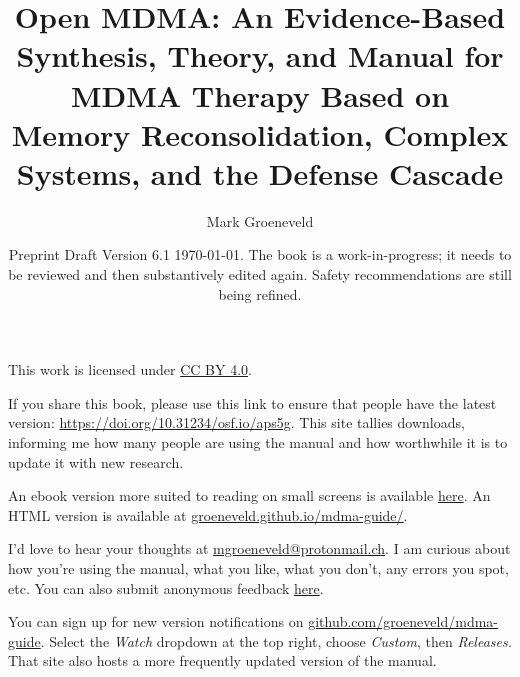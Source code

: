 \documentclass[11pt,oneside]{book}
\begin{document}

\frontmatter

\title{Open MDMA: An Evidence-Based Synthesis, Theory, and Manual for MDMA Therapy Based on Memory Reconsolidation, Complex Systems, and the Defense Cascade}
\author{
    Mark Groeneveld
}
\date{Preprint Draft Version 6.1 \today. The book is a work-in-progress; it needs to be reviewed and then substantively edited again. Safety recommendations are still being refined.}

\maketitle

\begin{center}
    This work is licensed under \href{https://creativecommons.org/licenses/by/4.0/}{CC BY 4.0}.

    \vspace{\baselineskip}

    If you share this book, please use this link to ensure that people have the latest version: \href{https://doi.org/10.31234/osf.io/aps5g}{https://doi.org/10.31234/osf.io/aps5g}. This site tallies downloads, informing me how many people are using the manual and how worthwhile it is to update it with new research.

    \vspace{\baselineskip}

    An ebook version more suited to reading on small screens is available \href{https://raw.githubusercontent.com/groeneveld/mdma-guide/refs/heads/main/Open%20MDMA.epub}{here}. An HTML version is available at \href{https://groeneveld.github.io/mdma-guide/}{groeneveld.github.io/mdma-guide/}.

    \vspace{\baselineskip}

    I'd love to hear your thoughts at \href{mailto:mgroeneveld@protonmail.ch}{mgroeneveld@protonmail.ch}. I am curious about how you're using the manual, what you like, what you don't, any errors you spot, etc. You can also submit anonymous feedback \href{https://docs.google.com/forms/d/e/1FAIpQLScZe2h4L9PcLQGGpuerk44FXiWThRC2w6YNwSm67OXIJun-rA/viewform?usp=dialog}{here}.

    \vspace{\baselineskip}

    You can sign up for new version notifications on \href{https://github.com/groeneveld/mdma-guide}{github.com/groeneveld/mdma-guide}. Select the \textit{Watch} dropdown at the top right, choose \textit{Custom}, then \textit{Releases.} That site also hosts a more frequently updated version of the manual.
\end{center}
\end{document}
